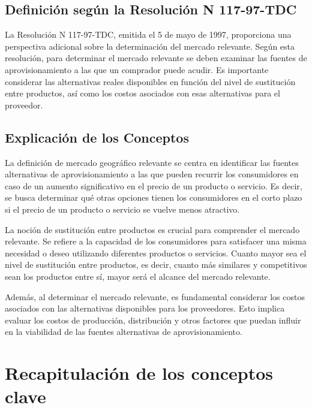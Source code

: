 \documentclass[
  doc,
  floatsintext,
  longtable,
  a4paper,
  nolmodern,
  notxfonts,
  notimes,
  12pt,
  colorlinks=true,linkcolor=blue,citecolor=blue,urlcolor=blue]{apa7}
\begin{document}
\subsection{Definición según la Resolución N
117-97-TDC}\label{definiciuxf3n-seguxfan-la-resoluciuxf3n-n-117-97-tdc}

La Resolución N 117-97-TDC, emitida el 5 de mayo de 1997, proporciona
una perspectiva adicional sobre la determinación del mercado relevante.
Según esta resolución, para determinar el mercado relevante se deben
examinar las fuentes de aprovisionamiento a las que un comprador puede
acudir. Es importante considerar las alternativas reales disponibles en
función del nivel de sustitución entre productos, así como los costos
asociados con esas alternativas para el proveedor.

\subsection{Explicación de los
Conceptos}\label{explicaciuxf3n-de-los-conceptos}

La definición de mercado geográfico relevante se centra en identificar
las fuentes alternativas de aprovisionamiento a las que pueden recurrir
los consumidores en caso de un aumento significativo en el precio de un
producto o servicio. Es decir, se busca determinar qué otras opciones
tienen los consumidores en el corto plazo si el precio de un producto o
servicio se vuelve menos atractivo.

La noción de sustitución entre productos es crucial para comprender el
mercado relevante. Se refiere a la capacidad de los consumidores para
satisfacer una misma necesidad o deseo utilizando diferentes productos o
servicios. Cuanto mayor sea el nivel de sustitución entre productos, es
decir, cuanto más similares y competitivos sean los productos entre sí,
mayor será el alcance del mercado relevante.

Además, al determinar el mercado relevante, es fundamental considerar
los costos asociados con las alternativas disponibles para los
proveedores. Esto implica evaluar los costos de producción, distribución
y otros factores que puedan influir en la viabilidad de las fuentes
alternativas de aprovisionamiento.

\section{Recapitulación de los conceptos
clave}\label{recapitulaciuxf3n-de-los-conceptos-clave}
\end{document}
